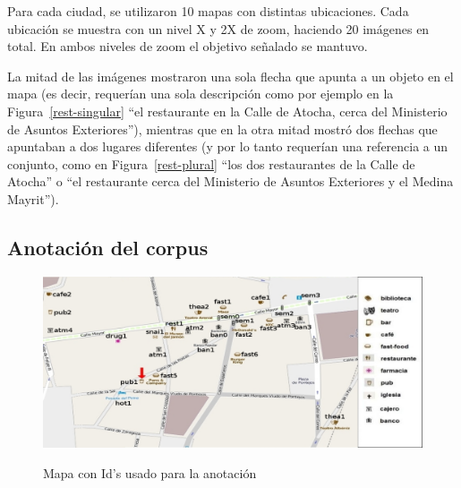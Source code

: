 Para cada ciudad, se utilizaron 10 mapas con distintas ubicaciones. Cada ubicaci\'on se muestra con un nivel X y 2X de zoom, haciendo 20 im\'agenes en total. En ambos niveles de zoom el objetivo se\~{n}alado se mantuvo.%

La mitad de las im\'agenes mostraron una sola flecha que apunta a un objeto en el mapa (es decir, requer\'{i}an una sola descripci\'on como por ejemplo en la Figura~\ref{rest-singular} ``el restaurante en la Calle de Atocha, cerca del Ministerio de Asuntos Exteriores''), mientras que en la otra mitad mostr\'o dos flechas que apuntaban a dos lugares diferentes (y por lo tanto requer\'ian una referencia a un conjunto, como en Figura~\ref{rest-plural} ``los dos restaurantes de la Calle de Atocha'' o ``el restaurante cerca del Ministerio de Asuntos Exteriores y el Medina Mayrit'').


\subsection{Anotaci\'on del corpus}
\label{corpus-anotacion}

\begin{figure}
\centering
\includegraphics[width=\textwidth]{figures/mapa-con-ids2.png}\\[0pt]
\caption{Mapa con Id's usado para la anotaci\'on}
\label{mapa-con-ids}
\end{figure}

